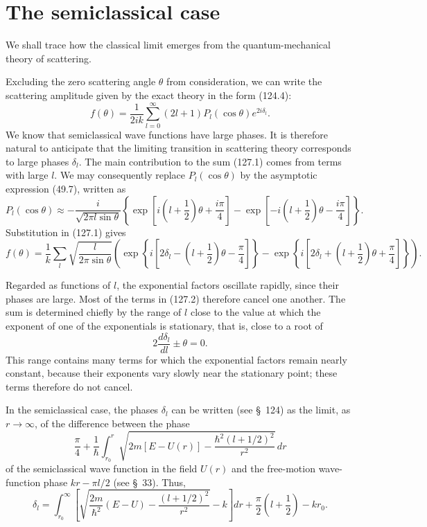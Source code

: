 \section{The semiclassical case}

We shall trace how the classical limit emerges from the quantum-mechanical theory of scattering.

Excluding the zero scattering angle $\theta$ from consideration, we can write the scattering amplitude given by the exact theory in the form (124.4):
\begin{equation}
 f(\theta)=\frac1{2ik}\sum_{l=0}^{\infty}(2l+1)P_l(\cos\theta)e^{2i\delta_l}.
 \tag{127.1}
\end{equation}
We know that semiclassical wave functions have large phases. It is therefore natural to anticipate that the limiting transition in scattering theory corresponds to large phases $\delta_l$. The main contribution to the sum (127.1) comes from terms with large $l$. We may consequently replace $P_l(\cos\theta)$ by the asymptotic expression (49.7), written as
\[
 P_l(\cos\theta)\approx-\frac{i}{\sqrt{2\pi l\sin\theta}}
 \left\{\exp\left[i\left(l+\frac12\right)\theta+\frac{i\pi}4\right]
 -\exp\left[-i\left(l+\frac12\right)\theta-\frac{i\pi}4\right]\right\}.
\]
Substitution in (127.1) gives
\begingroup\small
\begin{equation}
 f(\theta)=\frac1k\sum_l\sqrt{\frac{l}{2\pi\sin\theta}}
 \left(\exp\left\{i\left[2\delta_l-\left(l+\frac12\right)\theta-\frac\pi4\right]\right\}
 -\exp\left\{i\left[2\delta_l+\left(l+\frac12\right)\theta+\frac\pi4\right]\right\}\right).
\tag{127.2}
\end{equation}
\endgroup

Regarded as functions of $l$, the exponential factors oscillate rapidly, since their phases are large. Most of the terms in (127.2) therefore cancel one another. The sum is determined chiefly by the range of $l$ close to the value at which the exponent of one of the exponentials is stationary, that is, close to a root of
\begin{equation}
 2\frac{d\delta_l}{dl}\pm\theta=0.
 \tag{127.3}
\end{equation}
This range contains many terms for which the exponential factors remain nearly constant, because their exponents vary slowly near the stationary point; these terms therefore do not cancel.

In the semiclassical case, the phases $\delta_l$ can be written (see \S~124) as the limit, as $r\to\infty$, of the difference between the phase
\[
 \frac\pi4+\frac1\hbar\int_{r_0}^{r}
 \sqrt{2m[E-U(r)]-\frac{\hbar^2(l+1/2)^2}{r^2}}\,dr
\]
of the semiclassical wave function in the field $U(r)$ and the free-motion wave-function phase $kr-\pi l/2$ (see \S~33). Thus,
\begin{equation}
 \delta_l=\int_{r_0}^{\infty}\left[\sqrt{\frac{2m}{\hbar^2}(E-U)-\frac{(l+1/2)^2}{r^2}}-k\right]dr
 +\frac\pi2\left(l+\frac12\right)-kr_0.
 \tag{127.4}
\end{equation}


